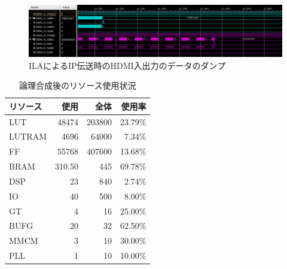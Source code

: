 
\begin{figure}[htbp]
  \begin{center}
    \includegraphics[bb=0 0 1199 246,width=22.5cm,angle=270]{img/fpga-ila-hdmi.png}
  \end{center}
  \caption{ILAによるIP伝送時のHDMI入出力のデータのダンプ}
  \label{fig:fpga-ila-hdmi}
\end{figure}


\begin{table}[htbp]
  \caption{論理合成後のリソース使用状況}
  \label{tb:fpga-post-implementation-utilization}
  \begin{center}
  \begin{tabular}{l|r|r|r}
    \hline
    リソース  & 使用    & 全体    & 使用率   \\\hline\hline
    LUT      &  48474 & 203800 & 23.79\% \\\hline
    LUTRAM   &   4696 &  64000 &  7.34\% \\\hline
    FF       &  55768 & 407600 & 13.68\% \\\hline
    BRAM     & 310.50 &    445 & 69.78\% \\\hline
    DSP      &     23 &    840 &  2.74\% \\\hline
    IO       &     40 &    500 &  8.00\% \\\hline
    GT       &      4 &     16 & 25.00\% \\\hline
    BUFG     &     20 &     32 & 62.50\% \\\hline
    MMCM     &      3 &     10 & 30.00\% \\\hline
    PLL      &      1 &     10 & 10.00\% \\\hline
  \end{tabular}\end{center}
\end{table}

